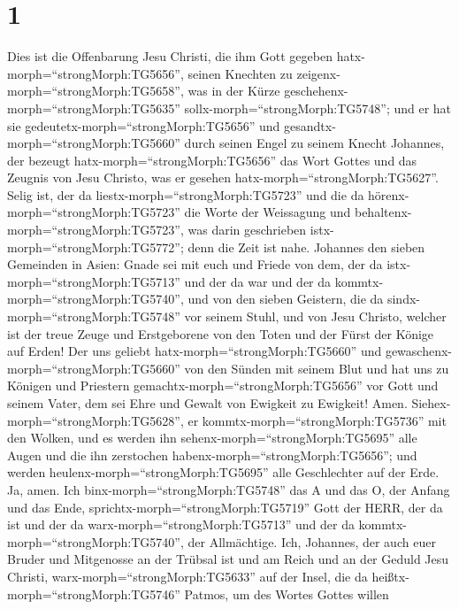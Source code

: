 \hypertarget{section}{%
\section{1}\label{section}}

 Dies ist die Offenbarung Jesu Christi, die ihm Gott gegeben
hatx-morph=``strongMorph:TG5656'', seinen Knechten zu
zeigenx-morph=``strongMorph:TG5658'', was in der Kürze
geschehenx-morph=``strongMorph:TG5635''
sollx-morph=``strongMorph:TG5748''; und er hat sie
gedeutetx-morph=``strongMorph:TG5656'' und
gesandtx-morph=``strongMorph:TG5660'' durch seinen Engel zu seinem
Knecht Johannes,  der bezeugt
hatx-morph=``strongMorph:TG5656'' das Wort Gottes und das Zeugnis von
Jesu Christo, was er gesehen hatx-morph=``strongMorph:TG5627''.
 Selig ist, der da liestx-morph=``strongMorph:TG5723'' und
die da hörenx-morph=``strongMorph:TG5723'' die Worte der Weissagung und
behaltenx-morph=``strongMorph:TG5723'', was darin geschrieben
istx-morph=``strongMorph:TG5772''; denn die Zeit ist nahe. 
Johannes den sieben Gemeinden in Asien: Gnade sei mit euch und Friede
von dem, der da istx-morph=``strongMorph:TG5713'' und der da war und der
da kommtx-morph=``strongMorph:TG5740'', und von den sieben Geistern, die
da sindx-morph=``strongMorph:TG5748'' vor seinem Stuhl,  und
von Jesu Christo, welcher ist der treue Zeuge und Erstgeborene von den
Toten und der Fürst der Könige auf Erden! Der uns geliebt
hatx-morph=``strongMorph:TG5660'' und
gewaschenx-morph=``strongMorph:TG5660'' von den Sünden mit seinem Blut
 und hat uns zu Königen und Priestern
gemachtx-morph=``strongMorph:TG5656'' vor Gott und seinem Vater, dem sei
Ehre und Gewalt von Ewigkeit zu Ewigkeit! Amen. 
Siehex-morph=``strongMorph:TG5628'', er
kommtx-morph=``strongMorph:TG5736'' mit den Wolken, und es werden ihn
sehenx-morph=``strongMorph:TG5695'' alle Augen und die ihn zerstochen
habenx-morph=``strongMorph:TG5656''; und werden
heulenx-morph=``strongMorph:TG5695'' alle Geschlechter auf der Erde. Ja,
amen.  Ich binx-morph=``strongMorph:TG5748'' das A und das
O, der Anfang und das Ende, sprichtx-morph=``strongMorph:TG5719'' Gott
der HERR, der da ist und der da warx-morph=``strongMorph:TG5713'' und
der da kommtx-morph=``strongMorph:TG5740'', der Allmächtige.
 Ich, Johannes, der auch euer Bruder und Mitgenosse an der
Trübsal ist und am Reich und an der Geduld Jesu Christi,
warx-morph=``strongMorph:TG5633'' auf der Insel, die da
heißtx-morph=``strongMorph:TG5746'' Patmos, um des Wortes Gottes willen
